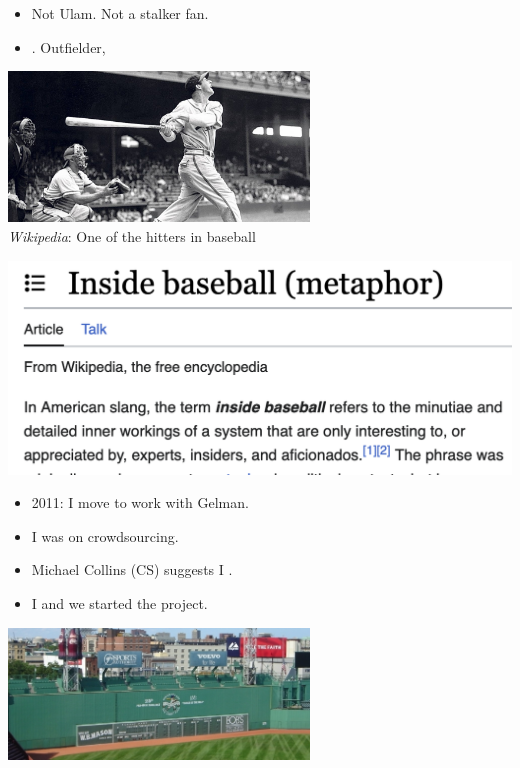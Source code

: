 \documentclass[9pt]{report}
\begin{document}
\begin{itemize}
\item Not Ulam. Not a stalker fan.
\item {}.  Outfielder, 
\end{itemize}
\begin{center}
  \spc\includegraphics[width=0.6\textwidth]{img/stan-the-man.jpeg}
  \\
  {\small {\slshape Wikipedia}: One of the  hitters in baseball}
  \end{center}


  \sld{}
  \vspace*{-24pt}
\begin{center}
    \spc\includegraphics[width=\textwidth]{img/inside-baseball.png}
  \end{center}
  \vfill
  \null

  
\begin{itemize}
\item 2011: I move  to work with 
  Gelman. 
\item I was  on crowdsourcing. 
\item Michael Collins (CS) suggests I .
\item I  and we started the  project.
\end{itemize}
\begin{center}
  \spc\includegraphics[width=0.6\textwidth]{img/fenway-fences.jpeg}
\end{center}
\end{document}
